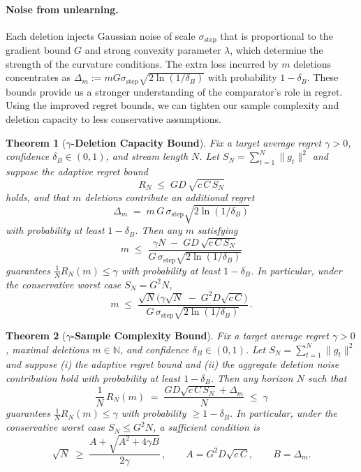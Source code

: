 \documentclass{article}
\theoremstyle{ssltheorem}
\newtheorem{theorem}{Theorem}
\begin{document}
\paragraph{Noise from unlearning.}
Each deletion injects Gaussian noise of scale
$
  \sigma_{\text{step}}
$ that is proportional to the gradient bound $G$ and strong convexity parameter $\lambda$, which determine the strength of the curvature conditions.
The extra loss incurred by $m$ deletions concentrates as
$
  \Delta_m
  := mG\sigma_{\text{step}}\sqrt{2\ln(1/\delta_{B})}
$
with probability $1-\delta_{B}$.
These bounds provide us a stronger understanding of the comparator's role in regret.
Using the improved regret bounds, we can tighten our sample complexity and deletion capacity to less conservative assumptions.
\begin{theorem}[{\bf $\gamma$-Deletion Capacity Bound}]
\label{thm:gamma-capacity}
\label{thm:gamma-adapt-capacity}
Fix a target average regret $\gamma>0$, confidence $\delta_B\in(0,1)$, and stream length $N$.
Let $S_{N}=\sum_{t=1}^N \|g_t\|^{2}$ and suppose the adaptive regret bound
$$
R_{N} \;\le\; GD\,\sqrt{c\,C\,S_{N}}
$$
holds, and that $m$ deletions contribute an additional regret
$$
\Delta_m \;=\;
m\,G\,\sigma_{\text{step}}\sqrt{2\ln(1/\delta_B)}
$$
with probability at least $1-\delta_{B}$. Then any $m$ satisfying
\begin{equation}
\label{eq:cap-main}
m \;\le\; \frac{\gamma N \;-\; GD\,\sqrt{c\,C\,S_{N}}}{G\,\sigma_{\text{step}}\sqrt{2\ln(1/\delta_B)}}
\end{equation}
guarantees $\frac{1}{N}R_{N}(m)\le\gamma$ with probability at least $1-\delta_B$.
In particular, under the
conservative worst case $S_{N}=G^{2}N$,
\begin{equation}
\label{eq:cap-worst}
m \;\le\; \frac{\sqrt{N}\bigl(\gamma\sqrt{N}\;-\;G^{2} D \sqrt{c\,C}\bigr)}
{G\,\sigma_{\text{step}}\sqrt{2\ln(1/\delta_B)}}\,.
\end{equation}
\end{theorem}

\begin{theorem}[{\bf $\gamma$-Sample Complexity Bound}]
\label{thm:gamma-sample}
Fix a target average regret $\gamma>0$, maximal deletions $m\in\mathbb{N}$, and confidence $\delta_B\in(0,1)$.
Let $S_{N}=\sum_{t=1}^N\|g_t\|^{2}$ and suppose (i) the adaptive regret bound
and (ii) the aggregate deletion noise contribution hold with probability at least $1-\delta_B$.
Then any horizon $N$ such that
\begin{equation}
\label{eq:sample-master}
\frac{1}{N}\,R_{N}(m)\;=\;\frac{GD\sqrt{c\,C\,S_{N}}+\Delta_m}{N}\;\le\;\gamma
\end{equation}
guarantees $\frac{1}{N}R_{N}(m)\le\gamma$ with probability $\ge 1-\delta_B$.
In particular, under the conservative worst case $S_{N}\le G^{2} N$, a sufficient condition is
\begin{equation}
\label{eq:sample-exact-root}
\sqrt{N}\;\ge\; \frac{A+\sqrt{A^{2}+4\gamma B}}{2\gamma}\,, \qquad A=G^{2}D\sqrt{c\,C}, \qquad B=\Delta_m.
\end{equation}
\end{theorem}
\end{document}
